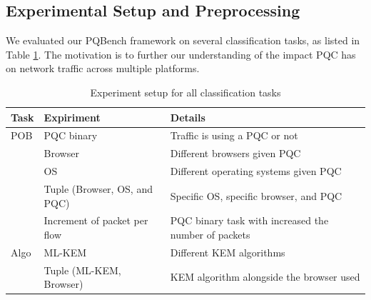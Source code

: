 \documentclass[10pt,journal]{IEEEtran}%
\begin{document}
\subsection{Experimental Setup and Preprocessing}
We evaluated our PQBench framework on several classification tasks, as listed in Table \ref{tab:experiments}.
The motivation is to further our understanding of the impact PQC has on network traffic across multiple platforms.
\begin{table}[!] \centering \caption{Experiment setup for all classification tasks} \vspace{1.5mm} \label{tab:experiments} \begin{tabular}{|l|l|l|} \hline \textbf{Task} & \textbf{Expiriment} & \textbf{Details} \\ \hline \hline POB & PQC binary & Traffic is using a PQC or not \\ \hline & Browser & Different browsers given PQC \\ \hline & OS & Different operating systems given PQC \\ \hline & Tuple (Browser, OS, and PQC) & Specific OS, specific browser, and PQC \\ \hline & Increment of packet per flow & PQC binary task with increased the number of packets \\ \hline Algo & ML-KEM & Different KEM algorithms \\ \hline & Tuple (ML-KEM, Browser) & KEM algorithm alongside the browser used \\ \hline \end{tabular} \end{table}

\end{document}
